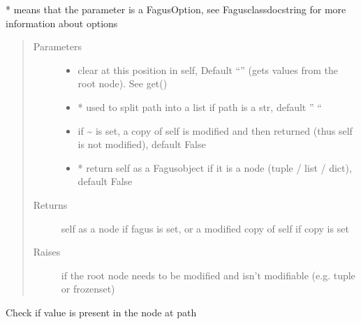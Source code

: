 \documentclass[a4paper,10pt,english]{sphinxmanual}
\begin{document}
\begin{fulllineitems}
\begin{fulllineitems}
\sphinxAtStartPar
* means that the parameter is a FagusOption, see Fagus\sphinxhyphen{}class\sphinxhyphen{}docstring for more information about options
\begin{quote}\begin{description}
\item[{Parameters}] \leavevmode\begin{itemize}
\item {}
\sphinxAtStartPar
{} \textendash{} clear at this position in self, Default “” (gets values from the root node). See get()

\item {}
\sphinxAtStartPar
{} \textendash{} * used to split path into a list if path is a str, default ” “

\item {}
\sphinxAtStartPar
{} \textendash{} if \textasciitilde{} is set, a copy of self is modified and then returned (thus self is not modified), default False

\item {}
\sphinxAtStartPar
{} \textendash{} * return self as a Fagus\sphinxhyphen{}object if it is a node (tuple / list / dict), default False

\end{itemize}

\item[{Returns}] \leavevmode
\sphinxAtStartPar
self as a node if fagus is set, or a modified copy of self if copy is set

\item[{Raises}] \leavevmode
\sphinxAtStartPar
{} \textendash{} if the root node needs to be modified and isn’t modifiable (e.g. tuple or frozenset)

\end{description}\end{quote}

\end{fulllineitems}


\begin{fulllineitems}
\label{\detokenize{fagus:fagus.Fagus.contains}}
\pysigstartsignatures
{}
\pysigstopsignatures
\sphinxAtStartPar
Check if value is present in the node at path


\end{fulllineitems}
\end{fulllineitems}
\end{document}
